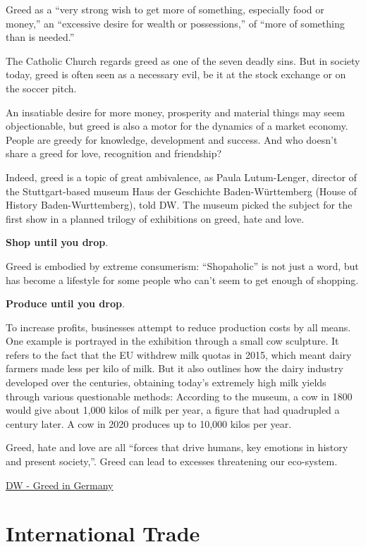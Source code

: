 \documentclass[
]{book}
\begin{document}
Greed as a ``very strong wish to get more of something, especially food or money,'' an ``excessive desire for wealth or possessions,'' of ``more of something than is needed.''

The Catholic Church regards greed as one of the seven deadly sins. But in society today, greed is often seen as a necessary evil, be it at the stock exchange or on the soccer pitch.

An insatiable desire for more money, prosperity and material things may seem objectionable, but greed is also a motor for the dynamics of a market economy. People are greedy for knowledge, development and success. And who doesn't share a greed for love, recognition and friendship?

Indeed, greed is a topic of great ambivalence, as Paula Lutum-Lenger, director of the Stuttgart-based museum Haus der Geschichte Baden-Württemberg (House of History Baden-Wurttemberg), told DW.
The museum picked the subject for the first show in a planned trilogy of exhibitions on greed, hate and love.

\textbf{Shop until you drop}.

Greed is embodied by extreme consumerism: ``Shopaholic'' is not just a word,
but has become a lifestyle for some people who can't seem to get enough of shopping.

\textbf{Produce until you drop}.

To increase profits, businesses attempt to reduce production costs by all means.
One example is portrayed in the exhibition through a small cow sculpture. It refers to the fact that the EU withdrew milk quotas in 2015, which meant dairy farmers made less per kilo of milk.
But it also outlines how the dairy industry developed over the centuries, obtaining today's extremely high milk yields through various questionable methods: According to the museum, a cow in 1800 would give about 1,000 kilos of milk per year, a figure that had quadrupled a century later. A cow in 2020 produces up to 10,000 kilos per year.

Greed, hate and love are all ``forces that drive humans, key emotions in history and present society,''.
Greed can lead to excesses threatening our eco-system.

\href{https://www.dw.com/en/exploring-the-impact-of-greed-in-germany/a-56898509}{DW - Greed in Germany}

\hypertarget{international-trade}{%
\chapter{International Trade}\label{international-trade}}
\end{document}
